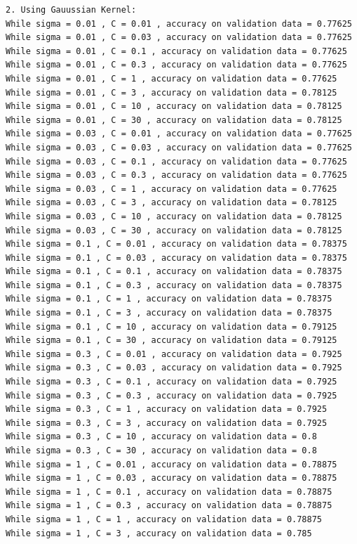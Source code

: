 \documentclass[paper=a4, fontsize=11pt]{scrartcl} %
\numberwithin{equation}{section} %
\numberwithin{figure}{section} %
\numberwithin{table}{section} %
\begin{document}
\begin{verbatim}
2. Using Gauussian Kernel:
While sigma = 0.01 , C = 0.01 , accuracy on validation data = 0.77625
While sigma = 0.01 , C = 0.03 , accuracy on validation data = 0.77625
While sigma = 0.01 , C = 0.1 , accuracy on validation data = 0.77625
While sigma = 0.01 , C = 0.3 , accuracy on validation data = 0.77625
While sigma = 0.01 , C = 1 , accuracy on validation data = 0.77625
While sigma = 0.01 , C = 3 , accuracy on validation data = 0.78125
While sigma = 0.01 , C = 10 , accuracy on validation data = 0.78125
While sigma = 0.01 , C = 30 , accuracy on validation data = 0.78125
While sigma = 0.03 , C = 0.01 , accuracy on validation data = 0.77625
While sigma = 0.03 , C = 0.03 , accuracy on validation data = 0.77625
While sigma = 0.03 , C = 0.1 , accuracy on validation data = 0.77625
While sigma = 0.03 , C = 0.3 , accuracy on validation data = 0.77625
While sigma = 0.03 , C = 1 , accuracy on validation data = 0.77625
While sigma = 0.03 , C = 3 , accuracy on validation data = 0.78125
While sigma = 0.03 , C = 10 , accuracy on validation data = 0.78125
While sigma = 0.03 , C = 30 , accuracy on validation data = 0.78125
While sigma = 0.1 , C = 0.01 , accuracy on validation data = 0.78375
While sigma = 0.1 , C = 0.03 , accuracy on validation data = 0.78375
While sigma = 0.1 , C = 0.1 , accuracy on validation data = 0.78375
While sigma = 0.1 , C = 0.3 , accuracy on validation data = 0.78375
While sigma = 0.1 , C = 1 , accuracy on validation data = 0.78375
While sigma = 0.1 , C = 3 , accuracy on validation data = 0.78375
While sigma = 0.1 , C = 10 , accuracy on validation data = 0.79125
While sigma = 0.1 , C = 30 , accuracy on validation data = 0.79125
While sigma = 0.3 , C = 0.01 , accuracy on validation data = 0.7925
While sigma = 0.3 , C = 0.03 , accuracy on validation data = 0.7925
While sigma = 0.3 , C = 0.1 , accuracy on validation data = 0.7925
While sigma = 0.3 , C = 0.3 , accuracy on validation data = 0.7925
While sigma = 0.3 , C = 1 , accuracy on validation data = 0.7925
While sigma = 0.3 , C = 3 , accuracy on validation data = 0.7925
While sigma = 0.3 , C = 10 , accuracy on validation data = 0.8
While sigma = 0.3 , C = 30 , accuracy on validation data = 0.8
While sigma = 1 , C = 0.01 , accuracy on validation data = 0.78875
While sigma = 1 , C = 0.03 , accuracy on validation data = 0.78875
While sigma = 1 , C = 0.1 , accuracy on validation data = 0.78875
While sigma = 1 , C = 0.3 , accuracy on validation data = 0.78875
While sigma = 1 , C = 1 , accuracy on validation data = 0.78875
While sigma = 1 , C = 3 , accuracy on validation data = 0.785

\end{verbatim}
\end{document}
